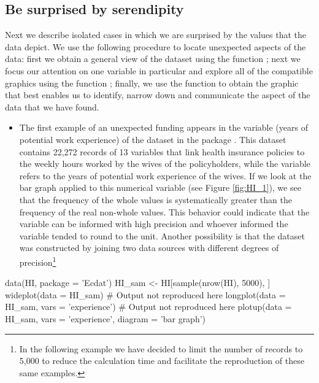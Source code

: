\hypertarget{be-surprised-by-serendipity}{%
	\subsection{Be surprised by
serendipity}\label{be-surprised-by-serendipity}}

Next we describe isolated cases in which we are surprised by the values
that the data depict. We use the following procedure to locate
unexpected aspects of the data: first we obtain a general view of the
dataset using the function ; next we focus our
attention on one variable in particular and explore all of the
compatible graphics using the function ; finally, we
use the function  to obtain the graphic that best enables
us to identify, narrow down and communicate the aspect of the data that
we have found.

\begin{itemize}
	\tightlist
	\item
	The first example of an unexpected funding appears in the variable
	 (years of potential work experience) of the dataset
	 in the package . This dataset contains 22,272
	records of 13 variables that link health insurance policies to the
	weekly hours worked by the wives of the policyholders, while the
	variable  refers to the years of potential work
	experience of the wives. If we look at the bar graph applied to this
	numerical variable (see Figure \ref{fig:HI_1}), we see that the
	frequency of the whole values is systematically greater than the
	frequency of the real non-whole values. This behavior could indicate
	that the variable can be informed with high precision and whoever
	informed the variable  tended to round to the unit.
	Another possibility is that the dataset was constructed by joining two
	data sources with different degrees of precision\footnote{In the
following example we have decided to limit the number of records to
5,000 to reduce the calculation time and facilitate the reproduction
of these same examples.}
\end{itemize}

\begin{example}
  data(HI, package = 'Ecdat')
  HI_sam <- HI[sample(nrow(HI), 5000), ]
  wideplot(data = HI_sam)                      # Output not reproduced here
  longplot(data = HI_sam, vars = 'experience') # Output not reproduced here
  plotup(data = HI_sam, vars = 'experience', diagram = 'bar graph')
\end{example}

